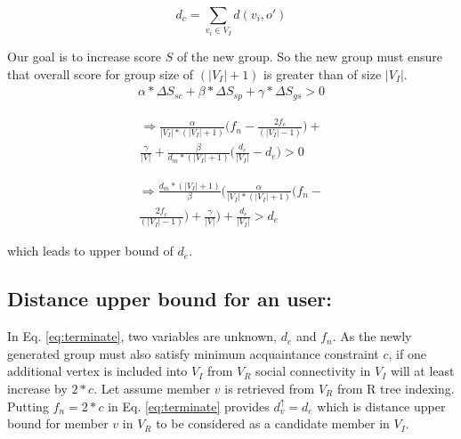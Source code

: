 \documentclass{vldb}
\begin{document}
		\[
		d_{c}= \sum_{v_i \in V_I} {d(v_i,o')}
		\]
		
		Our goal is to increase score $ S $ of the new group. So the new group must ensure that overall score for group size of $ (|V_I|+1) $ is greater than of size $ |V_I| $. 
		\begin{equation}
		\begin{split}
		\label{eq:better}
		\alpha*\Delta S_{sc} + \beta*\Delta S_{sp} + \gamma*\Delta S_{gs} > 0
		\end{split}		
		\end{equation}
			
		\begin{equation}
		\label{eq:targetEqn}
		\begin{split}
		\Rightarrow	
			\frac{\alpha}{|V_I|*(|V_I|+1)}\bigg(f_n-\frac{2f_c}{(|V_I|-1)}
					\bigg)+
			\\
			 \frac{\gamma}{|V|}+
			\frac{\beta}{d_m*(|V_I|+1)}\bigg(\frac{d_c}{|V_I|}-d_e\bigg) > 0
		\end{split}
		\end{equation}		
		
		
		
		\begin{equation}
		\label{eq:terminate}
		\begin{split}
		\Rightarrow
				\frac{d_m*(|V_I|+1)}{\beta}\Bigg(\frac{\alpha}{|V_I|*(|V_I|+1)}\bigg(f_n-
				\\
				\frac{2f_c}{(|V_I|-1)}
								\bigg)+
				 \frac{\gamma}{|V|}\Bigg)+
				\frac{d_c}{|V_I|} > d_e
		\end{split}
		\end{equation}
		
		
			which leads to  upper bound of 
			$ d_{e} $.
		\subsection{Distance upper bound for an user:}	In Eq. \eqref{eq:terminate}, two variables are unknown, $ d_{e}$ and $ f_{n} $. As the newly generated group must also satisfy minimum acquaintance constraint $ c $,  if one additional vertex is included into $ V_I $ from $ V_R $  social connectivity in $ V_I $ will at least increase by  $ 2*c $. Let assume member $ v $ is retrieved from $ V_R $ from R tree indexing.  Putting $ f_n=2*c  $ in Eq. \eqref{eq:terminate} provides
		$ d_v^\uparrow=d_e $ which is distance  upper bound for  member $ v $ in $ V_R $ to be considered as a candidate member in $ V_I $. 
		
\end{document}
